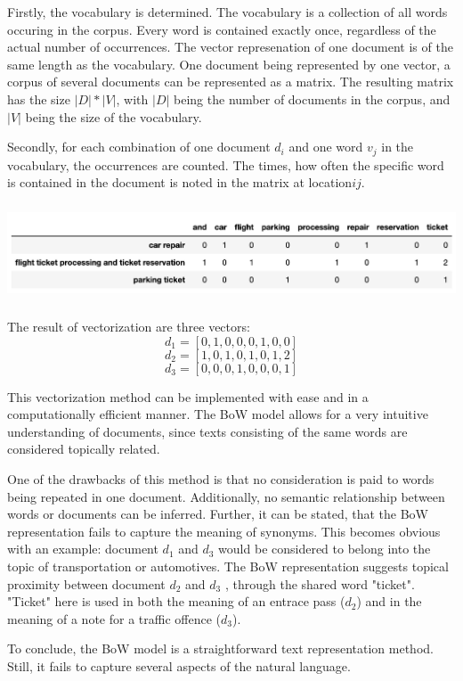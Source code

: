 		Firstly, the vocabulary is determined. 
		The vocabulary is a collection of all words occuring in the corpus. Every word is contained exactly once, regardless of the actual number of occurrences. The vector represenation of one document is of the same length as the vocabulary. One document being represented by one vector, a corpus of several documents can be represented as a matrix. The resulting matrix has the size $ |D|*|V| $, with $|D|$ being the number of documents in the corpus, and $|V|$ being the size of the vocabulary.
		
		Secondly, for each combination of one document $ d_{i} $ and one word $ v_{j} $ in the vocabulary, the occurrences are counted. The times, how often the specific word is contained in the document is noted in the matrix at location$  ij $.
		
		\includegraphics[height=2.9cm]{Bilder/bow.png}

		The result of vectorization are three vectors:
		\[ d_{1} = [0,1,0,0,0,1,0,0] \]
		\[ d_{2} = [1,0,1,0,1,0,1,2] \]	
		\[ d_{3} = [0,0,0,1,0,0,0,1]\]


		This vectorization method can be implemented with ease and in a computationally efficient manner. The \ac{BoW} model allows for a very intuitive understanding of documents, since texts consisting of the same words are considered topically related. 
		
		One of the drawbacks of this method is that no consideration is paid to words being repeated in one document. Additionally, no semantic relationship between words or documents can be inferred. 
		Further, it can be stated, that the \ac{BoW} representation fails to capture the meaning of synonyms. This becomes obvious with an example: document $ d_{1} $ and $ d_{3}$ would be considered to belong into the topic of transportation or automotives. The \ac{BoW} representation suggests topical proximity between document $ d_{2} $ and $ d_{3}$ , through the shared word "ticket". "Ticket" here is used in both the meaning of an entrace pass ($d_{2}$) and in the meaning of a note for a traffic offence  ($d_{3}$). 
		
		To conclude, the \ac{BoW} model is a straightforward text representation method. Still, it fails to capture several aspects of the natural language.
		
